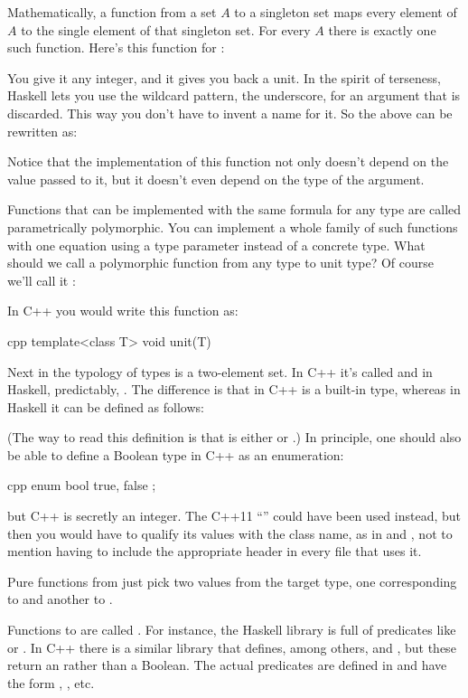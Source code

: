 Mathematically, a function from a set $A$ to a singleton set maps every
element of $A$ to the single element of that singleton set. For every $A$
there is exactly one such function. Here's this function for
:

You give it any integer, and it gives you back a unit. In the spirit of
terseness, Haskell lets you use the wildcard pattern, the underscore,
for an argument that is discarded. This way you don't have to invent a
name for it. So the above can be rewritten as:

Notice that the implementation of this function not only doesn't depend
on the value passed to it, but it doesn't even depend on the type of the
argument.

Functions that can be implemented with the same formula for any type are
called parametrically polymorphic. You can implement a whole family of
such functions with one equation using a type parameter instead of a
concrete type. What should we call a polymorphic function from any type
to unit type? Of course we'll call it :

In C++ you would write this function as:

\begin{snip}{cpp}
template<class T>
void unit(T) {}
\end{snip}
Next in the typology of types is a two-element set. In C++ it's called
 and in Haskell, predictably, . The difference
is that in C++  is a built-in type, whereas in Haskell it
can be defined as follows:

(The way to read this definition is that  is either
 or .) In principle, one should also be able
to define a Boolean type in C++ as an enumeration:

\begin{snip}{cpp}
enum bool {
    true,
    false
};
\end{snip}
but C++  is secretly an integer. The C++11
``'' could have been used instead, but then you
would have to qualify its values with the class name, as in
 and , not to mention having to
include the appropriate header in every file that uses it.

Pure functions from  just pick two values from the target
type, one corresponding to  and another to .

Functions to  are called . For instance,
the Haskell library  is full of predicates like
 or . In C++ there is a similar library
\code{} that defines, among others,  and
, but these return an  rather than a
Boolean. The actual predicates are defined in  and
have the form , , etc.

